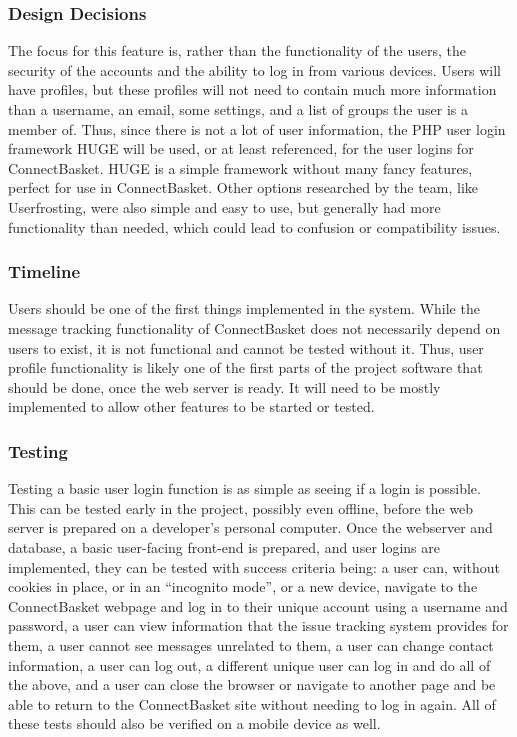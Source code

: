 \documentclass[onecolumn, draftclsnofoot,10pt, compsoc]{IEEEtran}
\begin{document}
\subsubsection{Design Decisions}
The focus for this feature is, rather than the functionality of the users, the security of the accounts and the ability to log in from various devices. Users will have profiles, but these profiles will not need to contain much more information than a username, an email, some settings, and a list of groups the user is a member of. Thus, since there is not a lot of user information, the PHP user login framework HUGE will be used, or at least referenced, for the user logins for ConnectBasket. HUGE is a simple framework without many fancy features, perfect for use in ConnectBasket. Other options researched by the team, like Userfrosting, were also simple and easy to use, but generally had more functionality than needed, which could lead to confusion or compatibility issues.

\subsubsection{Timeline}
Users should be one of the first things implemented in the system. While the message tracking functionality of ConnectBasket does not necessarily depend on users to exist, it is not functional and cannot be tested without it. Thus, user profile functionality is likely one of the first parts of the project software that should be done, once the web server is ready. It will need to be mostly implemented to allow other features to be started or tested.

\subsubsection{Testing}
Testing a basic user login function is as simple as seeing if a login is possible. This can be tested early in the project, possibly even offline, before the web server is prepared on a developer’s personal computer. Once the webserver and database, a basic user-facing front-end is prepared, and user logins are implemented, they can be tested with success criteria being: a user can, without cookies in place, or in an “incognito mode”, or a new device, navigate to the ConnectBasket webpage and log in to their unique account using a username and password, a user can view information that the issue tracking system provides for them, a user cannot see messages unrelated to them, a user can change contact information, a user can log out, a different unique user can log in and do all of the above, and a user can close the browser or navigate to another page and be able to return to the ConnectBasket site without needing to log in again. All of these tests should also be verified on a mobile device as well.
\end{document}
